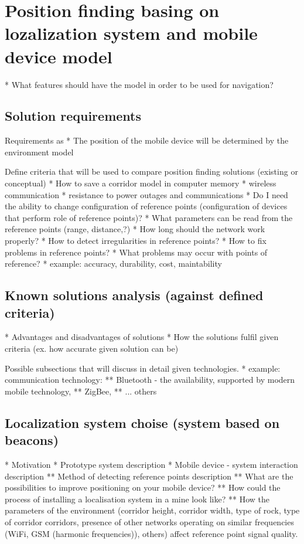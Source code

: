 \documentclass[../main.tex]{subfiles}
\begin{document}
\chapter{Position finding basing on lozalization system and mobile device model}
* What features should have the model in order to be used for navigation?

\section{Solution requirements}
Requirements as
* The position of the mobile device will be determined by the environment model

Define criteria that will be used to compare position finding solutions (existing or conceptual)
* How to save a corridor model in computer memory
* wireless communication
* resistance to power outages and communications
* Do I need the ability to change configuration of reference points (configuration of devices that perform role of reference points)?
* What parameters can be read from the reference points (range, distance,?)
* How long should the network work properly?
* How to detect irregularities in reference points?
* How to fix problems in reference points?
* What problems may occur with points of reference?
* example: accuracy, durability, cost, maintability


\section{Known solutions analysis (against defined criteria)}
* Advantages and disadvantages of solutions
* How the solutions fulfil given criteria (ex. how accurate given solution can be)

Possible subsections that will discuss in detail given technologies.
* example: communication technology:
** Bluetooth - the availability, supported by modern mobile technology,
** ZigBee,
** ... others


\section{Localization system choise (system based on beacons)}
* Motivation
* Prototype system description
* Mobile device - system interaction description
** Method of detecting reference points description
** What are the possibilities to improve positioning on your mobile device?
** How could the process of installing a localisation system in a mine look like?
** How the parameters of the environment (corridor height, corridor width, type of rock, type of corridor corridors, presence of other networks operating on similar frequencies (WiFi, GSM (harmonic frequencies)), others) affect reference point signal quality.
\end{document}
